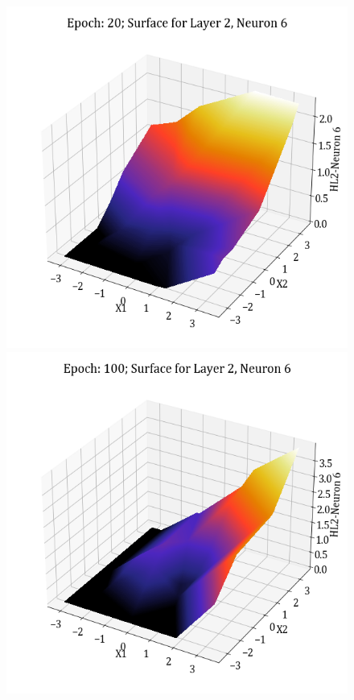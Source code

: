 \documentclass[11pt,a4paper]{article}
\begin{document}
\begin{figure}[H]
    \includegraphics[scale=0.4]{images/1B_MLFFNN_E20_HL2_N6.png}
    \includegraphics[scale=0.4]{images/1B_MLFFNN_E100_HL2_N6.png}

\end{figure}
\end{document}
